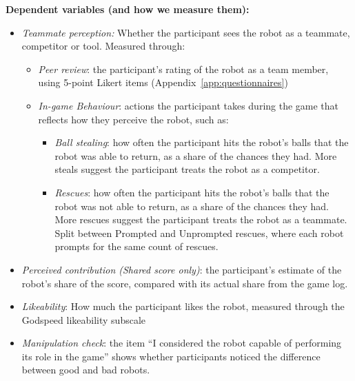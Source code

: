 \noindent\textbf{Dependent variables (and how we measure them):}

\begin{itemize}
    \item \textit{Teammate perception:} Whether the participant sees the robot as a teammate, competitor or tool. Measured through:
    \begin{itemize}
        \item \textit{Peer review}: the participant's rating of the robot as a team member, using 5-point Likert items (Appendix~\ref{app:questionnaires})

        \item \textit{In-game Behaviour}: actions the participant takes during the game that reflects how they perceive the robot, such as:
        \begin{itemize}
            \item \textit{Ball stealing}: how often the participant hits the robot's balls that the robot was able to return, as a share of the chances they had. More steals suggest the participant treats the robot as a competitor.

            \item \textit{Rescues}: how often the participant hits the robot's balls that the robot was not able to return, as a share of the chances they had. More rescues suggest the participant treats the robot as a teammate. Split between Prompted and Unprompted rescues, where each robot prompts for the same count of rescues.

        \end{itemize}
    \end{itemize}

    \item \textit{Perceived contribution (Shared score only)}: the participant's estimate of the robot's share of the score, compared with its actual share from the game log.

    \item \textit{Likeability}: How much the participant likes the robot, measured through the Godspeed likeability subscale

    \item \textit{Manipulation check}: the item ``I considered the robot capable of performing its role in the game'' shows whether participants noticed the difference between good and bad robots.

\end{itemize}



